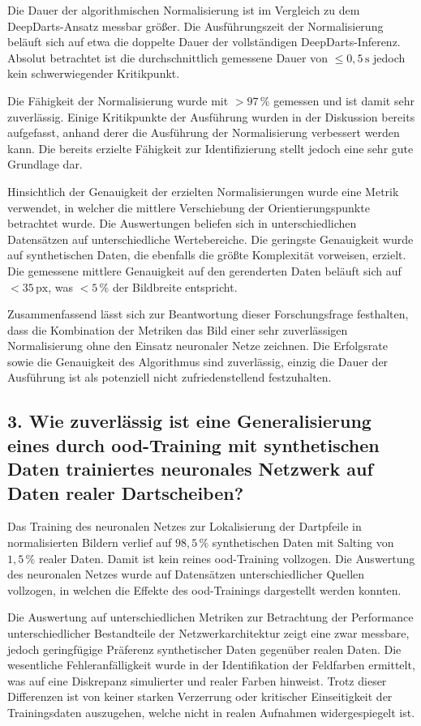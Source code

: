 Die Dauer der algorithmischen Normalisierung ist im Vergleich zu dem DeepDarts-Ansatz messbar größer. Die Ausführungszeit der Normalisierung beläuft sich auf etwa die doppelte Dauer der vollständigen DeepDarts-Inferenz. Absolut betrachtet ist die durchschnittlich gemessene Dauer von $\leq 0,\!5\,\text{s}$ jedoch kein schwerwiegender Kritikpunkt.

Die Fähigkeit der Normalisierung wurde mit $> 97\,\%$ gemessen und ist damit sehr zuverlässig. Einige Kritikpunkte der Ausführung wurden in der Diskussion bereits aufgefasst, anhand derer die Ausführung der Normalisierung verbessert werden kann. Die bereits erzielte Fähigkeit zur Identifizierung stellt jedoch eine sehr gute Grundlage dar.

Hinsichtlich der Genauigkeit der erzielten Normalisierungen wurde eine Metrik verwendet, in welcher die mittlere Verschiebung der Orientierungspunkte betrachtet wurde. Die Auswertungen beliefen sich in unterschiedlichen Datensätzen auf unterschiedliche Wertebereiche. Die geringste Genauigkeit wurde auf synthetischen Daten, die ebenfalls die größte Komplexität vorweisen, erzielt. Die gemessene mittlere Genauigkeit auf den gerenderten Daten beläuft sich auf $< 35\,\text{px}$, was $< 5\,\%$ der Bildbreite entspricht.

Zusammenfassend lässt sich zur Beantwortung dieser Forschungsfrage festhalten, dass die Kombination der Metriken das Bild einer sehr zuverlässigen Normalisierung ohne den Einsatz neuronaler Netze zeichnen. Die Erfolgsrate sowie die Genauigkeit des Algorithmus sind zuverlässig, einzig die Dauer der Ausführung ist als potenziell nicht zufriedenstellend festzuhalten.

\subsection*{3. Wie zuverlässig ist eine Generalisierung eines durch \ac{ood}-Training mit synthetischen Daten trainiertes neuronales Netzwerk auf Daten realer Dartscheiben?}

Das Training des neuronalen Netzes zur Lokalisierung der Dartpfeile in normalisierten Bildern verlief auf $98,\!5\,\%$ synthetischen Daten mit Salting von $1,\!5\,\%$ realer Daten. Damit ist kein reines \ac{ood}-Training vollzogen. Die Auswertung des neuronalen Netzes wurde auf Datensätzen unterschiedlicher Quellen vollzogen, in welchen die Effekte des \ac{ood}-Trainings dargestellt werden konnten.

Die Auswertung auf unterschiedlichen Metriken zur Betrachtung der Performance unterschiedlicher Bestandteile der Netzwerkarchitektur zeigt eine zwar messbare, jedoch geringfügige Präferenz synthetischer Daten gegenüber realen Daten. Die wesentliche Fehleranfälligkeit wurde in der Identifikation der Feldfarben ermittelt, was auf eine Diskrepanz simulierter und realer Farben hinweist. Trotz dieser Differenzen ist von keiner starken Verzerrung oder kritischer Einseitigkeit der Trainingsdaten auszugehen, welche nicht in realen Aufnahmen widergespiegelt ist.

